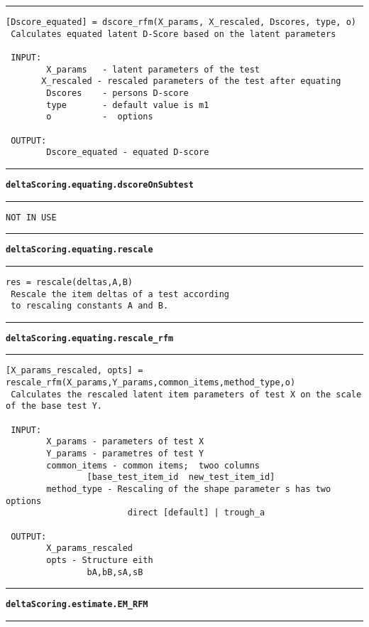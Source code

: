 \par\noindent\rule{\textwidth}{0.4pt}
\begin{lstlisting}[style=Matlab-bw]
 [Dscore_equated] = dscore_rfm(X_params, X_rescaled, Dscores, type, o)
 Calculates equated latent D-Score based on the latent parameters

 INPUT:
		X_params   - latent parameters of the test
       X_rescaled - rescaled parameters of the test after equating
		Dscores    - persons D-score
		type       - default value is m1
		o	       -  options

 OUTPUT:
		Dscore_equated - equated D-score
\end{lstlisting}
\par\noindent\rule{\textwidth}{0.4pt}
{\bf\tt deltaScoring.equating.dscoreOnSubtest}
\par\noindent\rule{\textwidth}{0.4pt}
\begin{lstlisting}[style=Matlab-bw]
 NOT IN USE
\end{lstlisting}
\par\noindent\rule{\textwidth}{0.4pt}
{\bf\tt deltaScoring.equating.rescale}
\par\noindent\rule{\textwidth}{0.4pt}
\begin{lstlisting}[style=Matlab-bw]
 res = rescale(deltas,A,B)
 Rescale the item deltas of a test according
 to rescaling constants A and B.
\end{lstlisting}
\par\noindent\rule{\textwidth}{0.4pt}
{\bf\tt deltaScoring.equating.rescale\_rfm}
\par\noindent\rule{\textwidth}{0.4pt}
\begin{lstlisting}[style=Matlab-bw]
 [X_params_rescaled, opts] = rescale_rfm(X_params,Y_params,common_items,method_type,o)
 Calculates the rescaled latent item parameters of test X on the scale of the base test Y.

 INPUT: 
		X_params - parameters of test X
		Y_params - parametres of test Y
		common_items - common items;  twoo columns 
				[base_test_item_id  new_test_item_id]
		method_type - Rescaling of the shape parameter s has two options
						direct [default] | trough_a 

 OUTPUT: 
		X_params_rescaled
		opts - Structure eith
				bA,bB,sA,sB
\end{lstlisting}
\par\noindent\rule{\textwidth}{0.4pt}
{\bf\tt deltaScoring.estimate.EM\_RFM}
\par\noindent\rule{\textwidth}{0.4pt}

